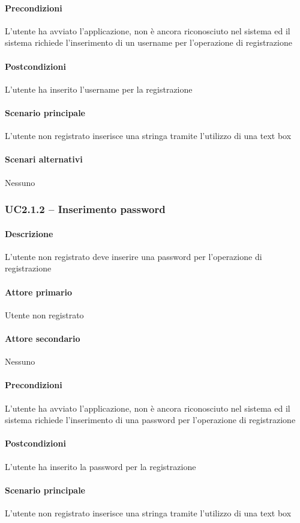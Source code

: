 \paragraph{Precondizioni}  L’utente ha avviato l’applicazione, non è ancora riconosciuto nel sistema ed il sistema richiede l’inserimento di un username per l’operazione di registrazione
\paragraph{Postcondizioni}  L’utente ha inserito l’username per la registrazione
\paragraph{Scenario principale}  
L’utente non registrato inserisce una stringa tramite l’utilizzo di una text box
\paragraph{Scenari alternativi}  Nessuno


\subsubsection{UC2.1.2 – Inserimento password}
\paragraph{Descrizione}  L’utente non registrato deve inserire una password per l’operazione di registrazione
\paragraph{Attore primario}  Utente non registrato
\paragraph{Attore secondario}  Nessuno
\paragraph{Precondizioni}  L’utente ha avviato l’applicazione, non è ancora riconosciuto nel sistema ed il sistema richiede l’inserimento di una password per l’operazione di registrazione
\paragraph{Postcondizioni}  L’utente ha inserito la password per la registrazione
\paragraph{Scenario principale}  
L’utente non registrato inserisce una stringa tramite l’utilizzo di una text box
